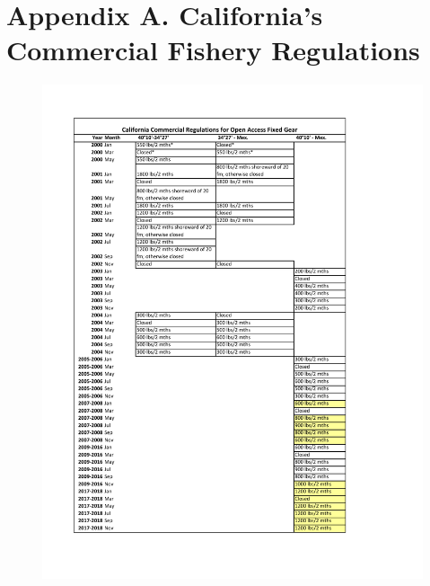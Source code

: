 \documentclass[12pt,]{article}
\begin{document}
\FloatBarrier

\FloatBarrier
\newpage

\hypertarget{appendix-a.-californias-commercial-fishery-regulations}{\section*{Appendix
A. California's Commercial Fishery
Regulations}\label{appendix-a.-californias-commercial-fishery-regulations}}

\renewcommand{\thepage}{A-\arabic{page}}
\renewcommand{\thefigure}{A\arabic{figure}}

\setcounter{page}{1} \setcounter{figure}{1}

\begin{figure}
\centering
\includegraphics{Figures/Comm_regs1.pdf}
\caption{\label{fig:Comm_regs1}}
\end{figure}
\end{document}
